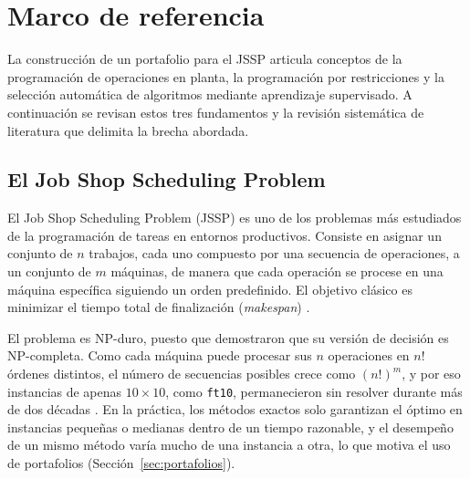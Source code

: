 \chapter{Marco de referencia}
\label{cap:marco}

La construcción de un portafolio para el JSSP articula conceptos de la
programación de operaciones en planta, la programación por restricciones y la
selección automática de algoritmos mediante aprendizaje supervisado. A
continuación se revisan estos tres fundamentos y la revisión sistemática de
literatura que delimita la brecha abordada.

\section{El Job Shop Scheduling Problem}
\label{sec:jssp}

El Job Shop Scheduling Problem (JSSP) es uno de los problemas más estudiados
de la programación de tareas en entornos productivos. Consiste en asignar un
conjunto de $n$ trabajos, cada uno compuesto por una secuencia de
operaciones, a un conjunto de $m$ máquinas, de manera que cada operación se
procese en una máquina específica siguiendo un orden predefinido. El objetivo
clásico es minimizar el tiempo total de finalización (\textit{makespan})
\citep{pinedo2022}.

El problema es NP-duro, puesto que \citet{garey1976} demostraron que su versión
de decisión es NP-completa. Como cada máquina puede procesar sus $n$
operaciones en $n!$ órdenes distintos, el número de secuencias posibles crece
como $(n!)^m$, y por eso instancias de apenas $10 \times 10$, como
\texttt{ft10}, permanecieron sin resolver durante más de dos décadas
\citep{fisher1963, carlier1989}. En la práctica, los métodos exactos solo
garantizan el óptimo en instancias pequeñas o medianas dentro de un tiempo
razonable, y el desempeño de un mismo método varía mucho de una instancia a
otra, lo que motiva el uso de portafolios (Sección~\ref{sec:portafolios}).

